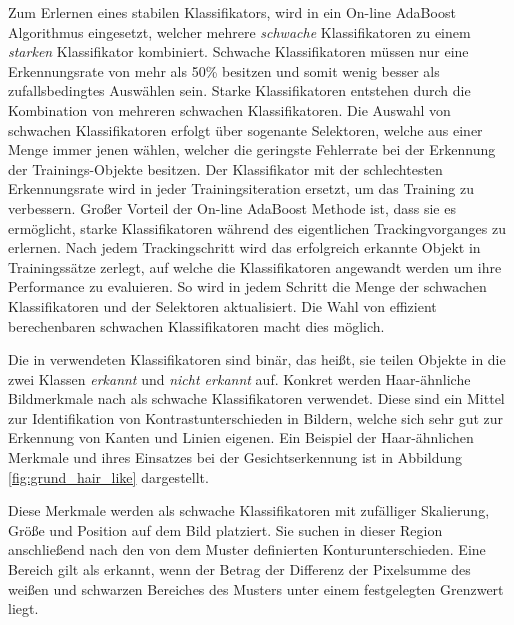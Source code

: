 Zum Erlernen eines stabilen Klassifikators, wird in \cite[]{Grabner} ein On-line AdaBoost Algorithmus eingesetzt,
welcher mehrere \textit{schwache} Klassifikatoren zu einem \textit{starken} Klassifikator kombiniert.
Schwache Klassifikatoren müssen nur eine Erkennungsrate von mehr als 50\% besitzen und somit
wenig besser als zufallsbedingtes Auswählen sein.
Starke Klassifikatoren entstehen durch die Kombination von mehreren schwachen Klassifikatoren.
Die Auswahl von schwachen Klassifikatoren erfolgt über sogenante Selektoren, welche aus einer Menge
immer jenen wählen, welcher die geringste Fehlerrate bei der Erkennung
der Trainings-Objekte besitzen. Der Klassifikator mit der schlechtesten Erkennungsrate wird in jeder
Trainingsiteration ersetzt, um das Training zu verbessern.
Großer Vorteil der On-line AdaBoost Methode ist, dass sie es ermöglicht, starke Klassifikatoren während des
eigentlichen Trackingvorganges zu erlernen. Nach jedem Trackingschritt wird das erfolgreich erkannte
Objekt in Trainingssätze zerlegt, auf welche die Klassifikatoren angewandt werden um ihre Performance zu evaluieren.
So wird in jedem Schritt die Menge der schwachen Klassifikatoren und der Selektoren aktualisiert. Die Wahl
von effizient berechenbaren schwachen Klassifikatoren macht dies möglich.

Die in \cite[]{Grabner} verwendeten Klassifikatoren sind binär, das heißt,
sie teilen Objekte in die zwei Klassen \textit{erkannt} und \textit{nicht erkannt} auf.
Konkret werden Haar-ähnliche Bildmerkmale nach \cite[]{Viola} als schwache Klassifikatoren verwendet.
Diese sind ein Mittel zur Identifikation von Kontrastunterschieden in Bildern, welche sich sehr gut
zur Erkennung von Kanten und Linien eigenen. Ein Beispiel der Haar-ähnlichen Merkmale und ihres Einsatzes
bei der Gesichtserkennung ist in Abbildung \ref{fig:grund_hair_like} dargestellt.

Diese Merkmale werden als schwache Klassifikatoren mit zufälliger Skalierung, Größe und Position
auf dem Bild platziert. Sie suchen in dieser Region anschließend nach den von dem Muster definierten
Konturunterschieden. Eine Bereich gilt als erkannt, wenn der Betrag der Differenz der Pixelsumme des weißen und
schwarzen Bereiches des Musters unter einem festgelegten Grenzwert liegt.

